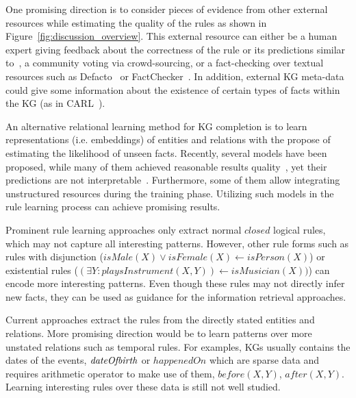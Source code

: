 One promising direction is to consider pieces of evidence from other external resources while estimating the quality of the rules as shown in Figure~\ref{fig:discussion_overview}. This external resource can either be a human expert giving feedback about the correctness of the rule or its predictions similar to~\cite{Dzyuba2017}, a community voting via crowd-sourcing, or a fact-checking over textual resources such as Defacto~\cite{defacto} or FactChecker~\cite{factchecker}. In addition, external KG meta-data could give some information about the existence of certain types of facts within the KG (as in CARL~\cite{carl}).

An alternative relational learning method for KG completion is to learn representations (i.e. embeddings) of entities and relations with the propose of estimating the likelihood of unseen facts. Recently, several models have been proposed, while many of them achieved reasonable results quality~\cite{Wang2017}, yet their predictions are not interpretable~\cite{Shakerin2018}. Furthermore, some of them allow integrating unstructured resources during the training phase. Utilizing such models in the rule learning process can achieve promising results.%

Prominent rule learning approaches only extract normal $closed$ logical rules, which may not capture all interesting patterns. However, other rule forms such as rules with disjunction (\eg $isMale(X) \vee isFemale(X) \leftarrow isPerson(X)$) or existential rules (\eg $(\exists Y: playsInstrument(X, Y)) \leftarrow isMusician(X))$) can encode more interesting patterns. Even though these rules may not directly infer new facts, they can be used as guidance for the information retrieval approaches.


 Current approaches extract the rules from the directly stated entities and relations. More promising direction would be to learn patterns over more unstated relations such as temporal rules. For examples, KGs usually contains the dates of the events, \eg $\mathit{dateOfbirth}$ or $happenedOn$ which are sparse data and requires arithmetic operator to make use of them, \eg $before(X,Y)$, $after(X,Y)$. Learning interesting rules over these data is still not well studied.







